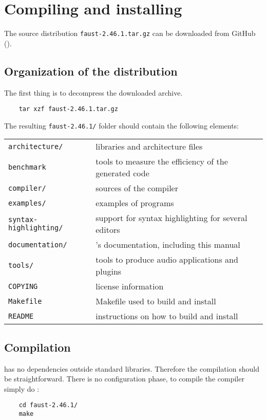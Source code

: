 \chapter{Compiling and installing \faust}
\label{sec:install}


The \faust source distribution \lstinline'faust-2.46.1.tar.gz' can be downloaded from GitHub ().

\section{Organization of the distribution}
The first thing is to decompress the downloaded archive. 
\begin{lstlisting}
	tar xzf faust-2.46.1.tar.gz
\end{lstlisting}

The resulting \lstinline'faust-2.46.1/' folder should contain the following elements:

\begin{tabular}{ll}
	\lstinline'architecture/' 		&\faust libraries and architecture files\\
	\lstinline'benchmark'			&tools to measure the efficiency of the generated code\\
	\lstinline'compiler/'			&sources of the \faust compiler\\
	\lstinline'examples/'			&examples of \faust programs\\
	\lstinline'syntax-highlighting/'&	support for syntax highlighting for several editors\\
	\lstinline'documentation/' 		&\faust's documentation, including this manual\\
	\lstinline'tools/'				&tools to produce audio applications and plugins\\
	\lstinline'COPYING'			&license information\\
	\lstinline'Makefile'			&Makefile used to build and install \faust\\
	\lstinline'README'			&instructions on how to build and install \faust
\end{tabular}

\section{Compilation}
\faust has no dependencies outside standard libraries. Therefore the compilation should be straightforward. There is no configuration phase, to compile the \faust compiler simply do :
\begin{lstlisting}
	cd faust-2.46.1/
	make
\end{lstlisting}

